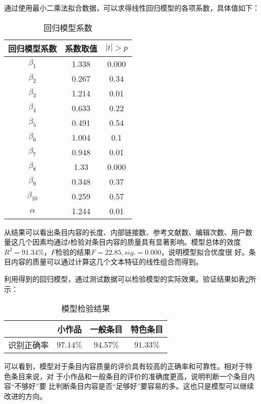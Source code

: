 
通过使用最小二乘法拟合数据，可以求得线性回归模型的各项系数，具体值如下：
\begin{table}[htb]
  \centering
\caption{\small{回归模型系数}}
 \small
  \begin{tabular}{|c|c|c|}
\hline
    回归模型系数&系数取值&$|t|>p$\\\hline
     $\beta_1$&1.338&0.000\\\hline
$\beta_2$&0.267&0.34\\\hline
$\beta_3$&1.214&0.01\\\hline
$\beta_4$&0.633&0.22\\\hline
$\beta_5$&0.491&0.54\\\hline
$\beta_6$&1.004&0.1\\\hline
$\beta_7$&0.948&0.01\\\hline
$\beta_8$&1.33&0.000\\\hline
$\beta_9$&0.348&0.37\\\hline
$\beta_{10}$&0.259&0.57\\\hline
$\alpha$&1.244&0.01\\\hline
  \end{tabular}
  
  \label{tab:coefficient}
\end{table}

从结果可以看出条目内容的长度、内部链接数、参考文献数、编辑次数、用户数
量这几个因素均通过$t$检验对条目内容的质量具有显著影响。模型总体的效度
$R^2=91.34\%$，$F$检验的结果$F=22.85, sig.=0.000$，说明模型拟合优度很
好。条目内容的质量可以通过计算这几个文本特征的线性组合而得到。

利用得到的回归模型，通过测试数据可以检验模型的实际效果。验证结果如表\ref{tab:model-test}所
示：
\begin{table}[htb]
  \centering
\small
\caption{\small{模型检验结果}} 
 \begin{tabular}{|c|c|c|c|}
 \hline
    &小作品&一般条目&特色条目\\\hline
识别正确率&$97.14\%$&$94.57\%$&$91.33\%$\\\hline
  \end{tabular}
  
  \label{tab:model-test}
\end{table}
可以看到，模型对于条目内容质量的评价具有较高的正确率和可靠性。相对于特
色条目来说，对
于小作品和一般条目的评价的准确度更高，说明判断一个条目内容“不够好”要
比判断条目内容是否“足够好”要容易的多。这也只是模型可以继续改进的方向。

